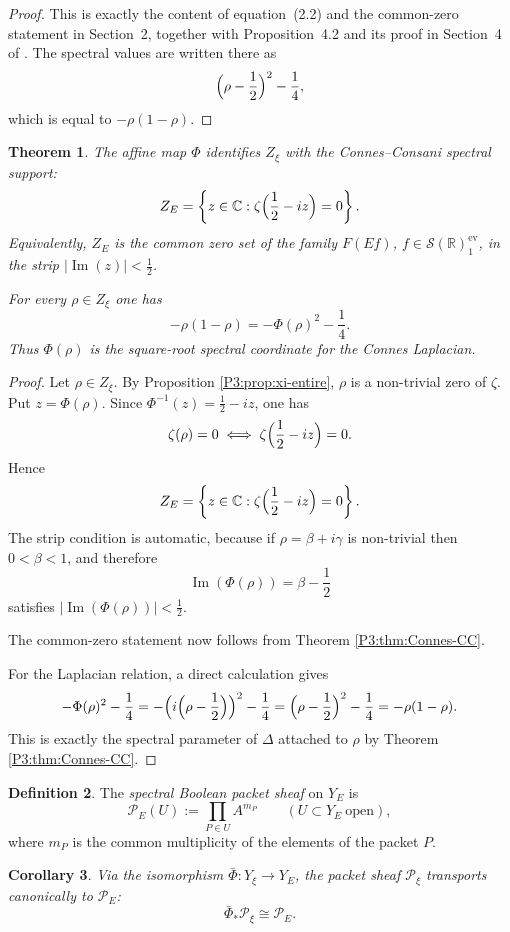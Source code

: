 \documentclass[11pt,a4paper]{article}
\numberwithin{equation}{section}
\newtheorem{theorem}{Theorem}[section]
\newtheorem{corollary}[theorem]{Corollary}
\theoremstyle{definition}
\newtheorem{definition}[theorem]{Definition}
\theoremstyle{remark}
\DeclareMathOperator{\Ima}{Im}
\newcommand{\RR}{\mathbb R}
\newcommand{\CC}{\mathbb C}
\newcommand{\cP}{\mathcal P}
\newcommand{\cS}{\mathcal S}
\begin{document}
\begin{proof}
This is exactly the content of equation~(2.2) and the common-zero statement in Section~2, together with Proposition~4.2 and its proof in Section~4 of \cite{ConnesConsaniCycles}.  The spectral values are written there as
\[
\Bigl(\rho-\frac12\Bigr)^2-\frac14,
\]
which is equal to $-\rho(1-\rho)$.
\end{proof}

\begin{theorem}\label{P3:thm:bridge}
The affine map $\Phi$ identifies $Z_\xi$ with the Connes--Consani spectral support:
\[
Z_E=\left\{z\in\CC:\zeta\Bigl(\frac12-iz\Bigr)=0\right\}.
\]
Equivalently, $Z_E$ is the common zero set of the family $F(Ef)$, $f\in\cS(\RR)^{\mathrm{ev}}_1$, in the strip $|\Ima(z)|<\frac12$.

For every $\rho\in Z_\xi$ one has
\[
-\rho(1-\rho)=-\Phi(\rho)^2-\frac14.
\]
Thus $\Phi(\rho)$ is the square-root spectral coordinate for the Connes Laplacian.
\end{theorem}

\begin{proof}
Let $\rho\in Z_\xi$.  By Proposition \ref{P3:prop:xi-entire}, $\rho$ is a non-trivial zero of $\zeta$.  Put $z=\Phi(\rho)$.  Since $\Phi^{-1}(z)=\frac12-iz$, one has
\[
\zeta(\rho)=0
\iff
\zeta\Bigl(\frac12-iz\Bigr)=0.
\]
Hence
\[
Z_E=\left\{z\in\CC:\zeta\Bigl(\frac12-iz\Bigr)=0\right\}.
\]
The strip condition is automatic, because if $\rho=\beta+i\gamma$ is non-trivial then $0<\beta<1$, and therefore
\[
\Ima(\Phi(\rho))=\beta-\frac12
\]
satisfies $|\Ima(\Phi(\rho))|<\frac12$.

The common-zero statement now follows from Theorem \ref{P3:thm:Connes-CC}.

For the Laplacian relation, a direct calculation gives
\[
-\Phi(\rho)^2-\frac14
=-\Bigl(i\Bigl(\rho-\frac12\Bigr)\Bigr)^2-\frac14
=\Bigl(\rho-\frac12\Bigr)^2-\frac14
=-\rho(1-\rho).
\]
This is exactly the spectral parameter of $\Delta$ attached to $\rho$ by Theorem \ref{P3:thm:Connes-CC}.
\end{proof}

\begin{definition}
The \emph{spectral Boolean packet sheaf} on $Y_E$ is
\[
\cP_E(U):=\prod_{P\in U} A^{m_P}
\qquad (U\subset Y_E\ \text{open}),
\]
where $m_P$ is the common multiplicity of the elements of the packet $P$.
\end{definition}

\begin{corollary}\label{P3:cor:packet-transport}
Via the isomorphism $\bar\Phi:Y_\xi\to Y_E$, the packet sheaf $\cP_\xi$ transports canonically to $\cP_E$:
\[
\bar\Phi_*\cP_\xi\cong \cP_E.
\]
\end{corollary}
\end{document}
